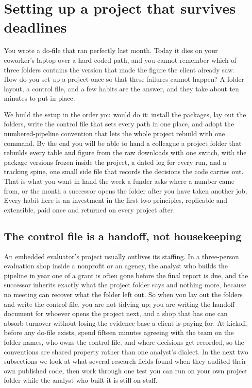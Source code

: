 \documentclass[
    a4paper,
    fontsize=10pt,
    twoside=true,
    numbers=noenddot,
]{kaobook}
\begin{document}
\chapter{Setting up a project that survives deadlines}\label{ch:workshop}

You wrote a do-file that ran perfectly last month. Today it dies on your coworker's laptop over a hard-coded path, and you cannot remember which of three folders contains the version that made the figure the client already saw. How do you set up a project once so that these failures cannot happen? A folder layout, a control file, and a few habits are the answer, and they take about ten minutes to put in place.

We build the setup in the order you would do it: install the packages, lay out the folders, write the control file that sets every path in one place, and adopt the numbered-pipeline convention that lets the whole project rebuild with one command. By the end you will be able to hand a colleague a project folder that rebuilds every table and figure from the raw downloads with one switch, with the package versions frozen inside the project, a dated log for every run, and a tracking spine, one small side file that records the decisions the code carries out. That is what you want in hand the week a funder asks where a number came from, or the month a successor opens the folder after you have taken another job. Every habit here is an investment in the first two principles, replicable and extensible, paid once and returned on every project after.

\section{The control file is a handoff, not housekeeping}\label{sec:ch02-teamscience}
An embedded evaluator's project usually outlives its staffing. In a three-person evaluation shop inside a nonprofit or an agency, the analyst who builds the pipeline in year one of a grant is often gone before the final report is due, and the successor inherits exactly what the project folder says and nothing more, because no meeting can recover what the folder left out. So when you lay out the folders and write the control file, you are not tidying up; you are writing the handoff document for whoever opens the project next, and a shop that has one can absorb turnover without losing the evidence base a client is paying for. At kickoff, before any do-file exists, spend fifteen minutes agreeing with the team on the folder names, who owns the control file, and where decisions get recorded, so the conventions are shared property rather than one analyst's dialect. In the next two subsections we look at what several research fields found when they audited their own published code, then work through one test you can run on your own project folder while the analyst who built it is still on staff.
\end{document}
